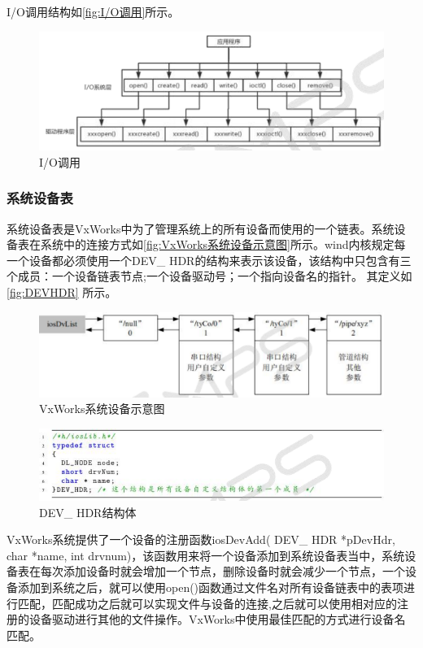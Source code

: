 	I/O调用结构如\autoref{fig:I/O调用}所示。
	\begin{figure}[!h]
\centering
\includegraphics[width=1.0\textwidth]{./graphics/IOCall.pdf}
\caption{I/O调用}\label{fig:I/O调用}
\end{figure}

	
\subsubsection{系统设备表}
	系统设备表是VxWorks中为了管理系统上的所有设备而使用的一个链表。系统设备表在系统中的连接方式如\autoref{fig:VxWorks系统设备示意图}所示。wind内核规定每一个设备都必须使用一个DEV\_ HDR的结构来表示该设备，该结构中只包含有三个成员：一个设备链表节点;一个设备驱动号；一个指向设备名的指针。
	其定义如\autoref{fig:DEVHDR} 所示。

\begin{figure}[!h]
\centering
\includegraphics[width=1.0\textwidth]{./graphics/vxworks-device-link.pdf}
\caption{VxWorks系统设备示意图}\label{fig:VxWorks系统设备示意图}
\end{figure}
	
\begin{figure}[!h]
\centering
\includegraphics[width=1.0\textwidth]{./graphics/DEVHDR.pdf}
\caption{DEV\_ HDR结构体}\label{fig:DEVHDR}
\end{figure}

VxWorks系统提供了一个设备的注册函数iosDevAdd( DEV\_ HDR *pDevHdr, char *name, int drvnum)，该函数用来将一个设备添加到系统设备表当中，系统设备表在每次添加设备时就会增加一个节点，删除设备时就会减少一个节点，一个设备添加到系统之后，就可以使用open()函数通过文件名对所有设备链表中的表项进行匹配，匹配成功之后就可以实现文件与设备的连接\cite{刘小军2008基于},之后就可以使用相对应的注册的设备驱动进行其他的文件操作。VxWorks中使用最佳匹配的方式进行设备名匹配。

